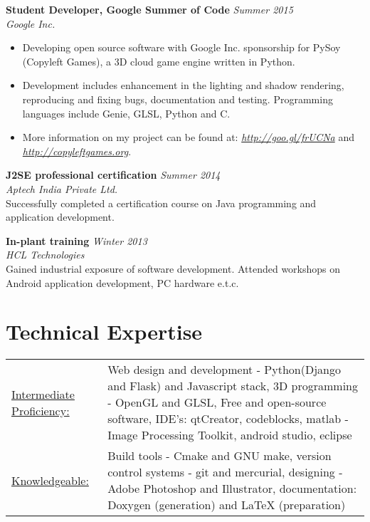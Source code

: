 \documentclass[margin]{res}
\begin{document}
\begin{resume}
	{\bf Student Developer, Google Summer of Code} \hfill {\sl Summer 2015}
	\\{\sl Google Inc.}
	\begin{itemize}
	\item Developing open source software with Google Inc. sponsorship for PySoy (Copyleft Games), a 3D cloud game engine written in Python.
 \item Development includes enhancement in the lighting and shadow rendering, reproducing and fixing bugs, documentation and testing. Programming languages include Genie, GLSL, Python and C. 
	\item More information on my project can be found at: {\sl \underline{http://goo.gl/frUCNa}} and {\sl \underline{http://copyleftgames.org}}.
	\end{itemize}
	
	{\bf J2SE professional certification} {\sl \hfill Summer 2014 }
	\\{\sl Aptech India Private Ltd.}
	\\Successfully completed a certification course on Java programming and application development.

 {\bf In-plant training} {\sl \hfill Winter 2013} 
 \\{\sl HCL Technologies}
 \\Gained industrial exposure of software development. Attended workshops on Android application development, PC hardware e.t.c.

\section{Technical Expertise}

\begin{tabular}{l p{3.5in}}
    \underline{Intermediate Proficiency:} & Web design and development - Python(Django and Flask) and Javascript stack, 3D programming - OpenGL and GLSL, Free and open-source software, IDE's: qtCreator, codeblocks, matlab - Image Processing Toolkit, android studio, eclipse\\
		
		\underline{Knowledgeable:} & Build tools - Cmake and GNU make, version control systems - git and mercurial, designing - Adobe Photoshop and Illustrator, documentation: Doxygen (generation) and LaTeX (preparation)
  \end{tabular}
	\\\\

\end{resume}
\end{document}
